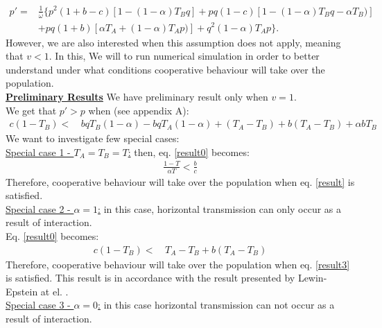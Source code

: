 \documentclass{article}
\begin{document}
\begin{equation} 
\begin{split}\label{modeleq}
p' =& \frac{1}{\overline{\omega}} \{ p^2(1+b-c)[1-(1-\alpha)T_Bq] + pq(1-c)[1-(1-\alpha)T_Bq-\alpha T_B)]\\
&+ pq(1+b)[\alpha T_A+(1-\alpha)T_Ap)] + q^2(1-\alpha)T_Ap\}.
\end{split}
\end{equation}
However, we are also interested when this assumption does not apply, meaning that $v<1$. In this, We will to run numerical simulation in order to better understand under what conditions cooperative behaviour will take over the population. 
\\\textbf{\underline{Preliminary Results}}
We have preliminary result only when $v=1$.
\\We get that $p'>p$ when (see appendix A):
\begin{equation} 
\begin{split} \label{result0}
 c(1-T_B) < & \,  bqT_B(1-\alpha) - bqT_A(1-\alpha) + (T_A-T_B) + b(T_A - T_B) + \alpha bT_B
\end{split}
\end{equation}
We want to investigate few special cases:
\\\underline{Special case 1 - $T_A = T_B = T$:} then, eq. \eqref{result0} becomes:
\begin{equation}
\begin{split} \label{result}
 \frac{1-T}{\alpha T}< \frac{b}{c}
\end{split}
\end{equation}
Therefore, cooperative behaviour will take over the population when eq. \eqref{result} is satisfied.  
\\\underline{Special case 2 - $\alpha =1$:} in this case, horizontal transmission can only occur as a result of interaction.
\\Eq. \eqref{result0} becomes:
\begin{equation} 
\begin{split} \label{result3}
c(1-T_B)  < & \, T_A -T_B +b(T_A-T_B)
\end{split}
\end{equation}
Therefore, cooperative behaviour will take over the population when eq. \eqref{result3} is satisfied. 
This result is in accordance with the result presented by Lewin-Epstein at el. \cite{Ohad}. 
\\\underline{Special case 3 - $\alpha = 0$:} in this case horizontal transmission can not occur as a result of interaction.  
\end{document}
